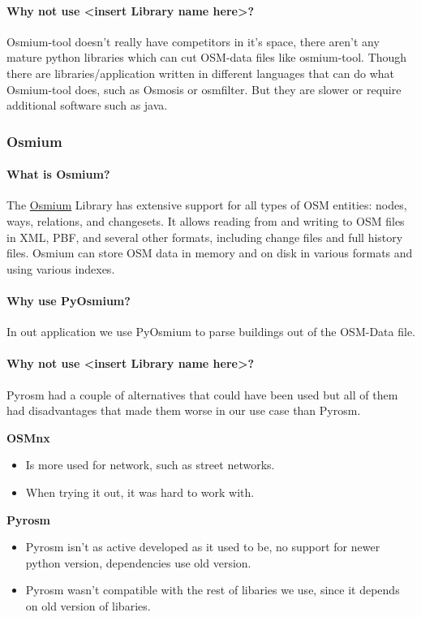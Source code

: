 \documentclass[parskip=full]{scrartcl} %
\begin{document}
\paragraph{Why not use <insert Library name here>?}
Osmium-tool doesn't really have competitors in it's space, there aren't any mature python libraries which can cut OSM-data files like osmium-tool.
Though there are libraries/application written in different languages that can do what Osmium-tool does, such as Osmosis or osmfilter.
But they are slower or require additional software such as java.


\subsubsection{Osmium}

\paragraph{What is Osmium?}
The \href{https://osmcode.org/libosmium/}{Osmium} Library has extensive support for all types of OSM entities: nodes, ways, relations, and changesets. It allows reading from and writing to OSM files in XML, PBF, and several other formats, including change files and full history files. Osmium can store OSM data in memory and on disk in various formats and using various indexes.

\paragraph{Why use PyOsmium?}
In out application we use PyOsmium to parse buildings out of the OSM-Data file.

\paragraph{Why not use <insert Library name here>?}
Pyrosm had a couple of alternatives that could have been used but all of them had disadvantages that made them worse in our use case than Pyrosm. 
  
\textbf{OSMnx}
\begin{itemize}
    \item Is more used for network, such as street networks. 
    \item When trying it out, it was hard to work with.
\end{itemize}


\textbf{Pyrosm}
\begin{itemize}
    \item Pyrosm isn't as active developed as it used to be, no support for newer python version, dependencies use old version.
    \item Pyrosm wasn't compatible with the rest of libaries we use, since it depends on old version of libaries.
\end{itemize}
\end{document}
